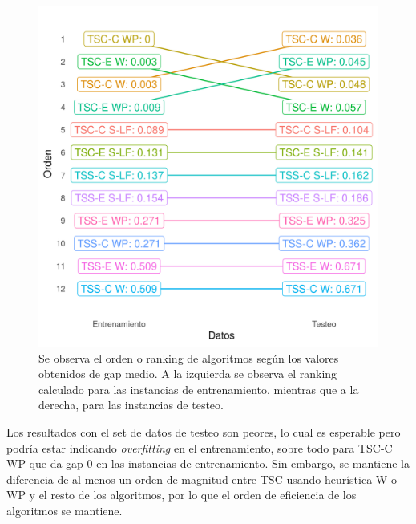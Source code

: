\begin{figure}[H]
    \centering
    \includegraphics[scale = 0.7]{plots/ranking.png}
    \caption{Se observa el orden o ranking de algoritmos según los valores obtenidos de gap medio. A la izquierda se observa el ranking calculado para las instancias de entrenamiento, mientras que a la derecha, para las instancias de testeo.}
    \label{plot:ranking}
\end{figure}

Los resultados con el set de datos de testeo son peores, lo cual es esperable pero podría estar indicando \textit{overfitting} en el entrenamiento, sobre todo para TSC-C WP que da gap 0 en las instancias de entrenamiento. Sin embargo, se mantiene la diferencia de al menos un orden de magnitud entre TSC usando heurística W o WP y el resto de los algoritmos, por lo que el orden de eficiencia de los algoritmos se mantiene.